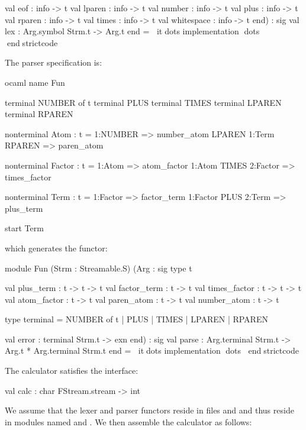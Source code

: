 \documentclass[10pt]{article}
\begin{document}
\begin{strictcode}
\begin{strictcode}
\begin{strictcode}
\begin{strictcode}
\begin{strictcode}
\begin{strictcode}
\begin{strictcode}
\begin{strictcode}
\begin{strictcode}
\begin{strictcode}
\begin{strictcode}
\begin{strictcode}
\begin{strictcode}
\begin{bigstrictcode}
\begin{strictcode}
          val eof : info -> t
          val lparen : info -> t
          val number : info -> t
          val plus : info -> t
          val rparen : info -> t
          val times : info -> t
          val whitespace : info -> t
       end)
   :
   sig
      val lex : Arg.symbol Strm.t -> Arg.t
   end
= itdots implementation dots
endstrictcode

The parser specification is:

\begin{code}
ocaml
name Fun

terminal NUMBER of t
terminal PLUS
terminal TIMES
terminal LPAREN
terminal RPAREN

nonterminal Atom : t =
  1:NUMBER => number_atom
  LPAREN 1:Term RPAREN => paren_atom

nonterminal Factor : t =
  1:Atom => atom_factor
  1:Atom TIMES 2:Factor => times_factor

nonterminal Term : t =
  1:Factor => factor_term
  1:Factor PLUS 2:Term => plus_term

start Term
\end{code}

\noindent
which generates the functor:

\begin{strictcode}
module Fun
   (Strm : Streamable.S)
   (Arg :
       sig
          type t

          val plus_term : t -> t -> t
          val factor_term : t -> t
          val times_factor : t -> t -> t
          val atom_factor : t -> t
          val paren_atom : t -> t
          val number_atom : t -> t

          type terminal =
             NUMBER of t
           | PLUS
           | TIMES
           | LPAREN
           | RPAREN

          val error : terminal Strm.t -> exn
       end)
   :
   sig
      val parse : Arg.terminal Strm.t -> Arg.t * Arg.terminal Strm.t
   end
= itdots implementation dots
endstrictcode

The calculator satisfies the interface:

\begin{code}
val calc : char FStream.stream -> int
\end{code}

We assume that the lexer and parser functors reside in files
 and  and thus reside in modules named
 and .  We then assemble the calculator as
follows:


\end{strictcode}
\end{strictcode}
\end{bigstrictcode}
\end{strictcode}
\end{strictcode}
\end{strictcode}
\end{strictcode}
\end{strictcode}
\end{strictcode}
\end{strictcode}
\end{strictcode}
\end{strictcode}
\end{strictcode}
\end{strictcode}
\end{strictcode}
\end{strictcode}
\end{document}

